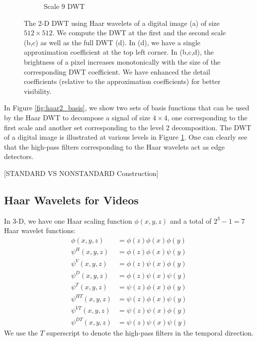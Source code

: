 \begin{figure}
\begin{subfigure}{0.4\textwidth}
  \caption{Scale 9 DWT}
\end{subfigure}
\caption[2-D Haar DWT Example]{The 2-D DWT using Haar wavelets of a digital image (a) of size $512\times 512$.
  We compute the DWT at the first and the second scale (b,c) as well as the full DWT (d).
  In (d), we have a single approximation coefficient at the top left corner.
  In (b,c,d), the brightness of a pixel increases monotonically with the size of the corresponding DWT coefficient.
  We have enhanced the detail coefficients (relative to the approximation coefficients) for better visibility.}
\label{fig:dwt2}
\end{figure}

In Figure \ref{fig:haar2_basis}, we show two sets of basis functions that can be used by the Haar DWT to decompose a signal of size $4\times 4$, one corresponding to the first scale and another set corresponding to the level 2 decomposition.
The DWT of a digital image is illustrated at various levels in Figure \ref{fig:dwt2}.
One can clearly see that the high-pass filters corresponding to the Haar wavelets act as edge detectors.

[STANDARD VS NONSTANDARD Construction]

\subsection{Haar Wavelets for Videos}
In 3-D, we have one Haar scaling function $\phi(x,y,z)$ and a total of $2^3-1=7$ Haar wavelet functions:
\begin{equation*}
  \begin{split}
    \phi(x,y,z) &= \phi(z) \phi(x) \phi(y)\\
    \psi^H(x,y,z) &=\phi(z) \phi(x) \psi(y) \\
    \psi^V(x,y,z) &=\phi(z) \psi(x) \phi(y) \\
    \psi^D(x,y,z) &=\phi(z) \psi(x) \psi(y) \\
    \psi^T(x,y,z) &= \psi(z) \phi(x) \phi(y)\\
    \psi^{HT}(x,y,z) &=\psi(z) \phi(x) \psi(y) \\
    \psi^{VT}(x,y,z) &=\psi(z) \psi(x) \phi(y) \\
    \psi^{DT}(x,y,z) &=\psi(z) \psi(x) \psi(y)
  \end{split}
\end{equation*}
We use the $T$ superscript to denote the high-pass filters in the temporal direction.

